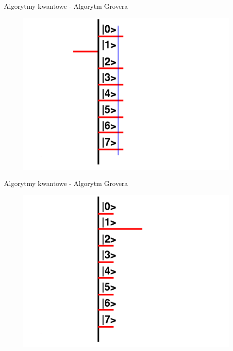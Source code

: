\documentclass{beamer}
\begin{document}
	\begin{frame}{Algorytmy kwantowe - Algorytm Grovera}
		\vspace{0.5em}
		\begin{center}
			\begin{figure}
				\includegraphics[scale=0.35]{media/visualization3.png}
			\end{figure}
		\end{center}
		\vspace{0.5em}
	\end{frame}		
	
		\begin{frame}{Algorytmy kwantowe - Algorytm Grovera}
		\vspace{0.5em}
		\begin{center}
			\begin{figure}
				\includegraphics[scale=0.35]{media/visualization4.png}
			\end{figure}
		\end{center}
		\vspace{0.5em}
	\end{frame}
	
\end{document}
